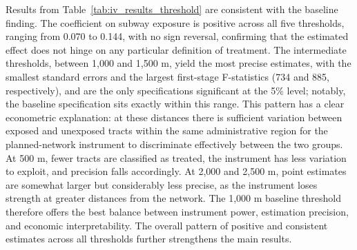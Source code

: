 Results from Table~\ref{tab:iv_results_threshold} are consistent with the baseline finding. The coefficient on subway exposure is positive across all five thresholds, ranging from 0.070 to 0.144, with no sign reversal, confirming that the estimated effect does not hinge on any particular definition of treatment. The intermediate thresholds, between 1,000 and 1,500 m, yield the most precise estimates, with the smallest standard errors and the largest first-stage F-statistics (734 and 885, respectively), and are the only specifications significant at the 5\% level; notably, the baseline specification sits exactly within this range. This pattern has a clear econometric explanation: at these distances there is sufficient variation between exposed and unexposed tracts within the same administrative region for the planned-network instrument to discriminate effectively between the two groups. At 500 m, fewer tracts are classified as treated, the instrument has less variation to exploit, and precision falls accordingly. At 2,000 and 2,500 m, point estimates are somewhat larger but considerably less precise, as the instrument loses strength at greater distances from the network. The 1,000 m baseline threshold therefore offers the best balance between instrument power, estimation precision, and economic interpretability. The overall pattern of positive and consistent estimates across all thresholds further strengthens the main results.
\vspace{0.75cm}

